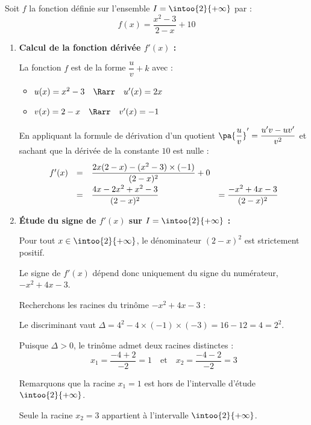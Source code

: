 \begin{ex}
	Soit $f$ la fonction définie sur l'ensemble $I = \intoo{2}{+\infty}$ par :
	\[
		f(x) = \frac{x^2 - 3}{2 - x} + 10
	\]

	\begin{enumerate}
		\item \textbf{Calcul de la fonction dérivée $f'(x)$ :}

		      La fonction $f$ est de la forme $\dfrac{u}{v} + k$ avec :
		      \begin{itemize}
			      \item $u(x) = x^2 - 3 \quad\Rarr\quad u'(x) = 2x$
			      \item $v(x) = 2 - x \quad\Rarr\quad v'(x) = -1$
		      \end{itemize}

		      En appliquant la formule de dérivation d'un quotient $\pa{\dfrac{u}{v}}' = \dfrac{u'v - uv'}{v^2}$ et sachant que la dérivée de la constante $10$ est nulle :
		      \[
			      \def\arraystretch{2}
			      \begin{array}{rcll}
				      f'(x) & = & \dfrac{2x(2 - x) - (x^2 - 3) \times (-1)}{(2 - x)^2} + 0 &                                    \\
				            & = & \dfrac{4x - 2x^2 + x^2 - 3}{(2 - x)^2}                   & = \dfrac{-x^2 + 4x - 3}{(2 - x)^2}
			      \end{array}
		      \]

		\item \textbf{Étude du signe de $f'(x)$ sur $I = \intoo{2}{+\infty}$ :}

		      Pour tout $x \in \intoo{2}{+\infty}$, le dénominateur $(2 - x)^2$ est strictement positif.

		      Le signe de $f'(x)$ dépend donc uniquement du signe du numérateur, $-x^2 + 4x - 3$.

		      Recherchons les racines du trinôme $-x^2 + 4x - 3$ :

		      Le discriminant vaut $\Delta = 4^2 - 4 \times (-1) \times (-3) = 16 - 12 = 4 = 2^2$.

		      Puisque $\Delta > 0$, le trinôme admet deux racines distinctes :
		      \[
			      x_1 = \frac{-4 + 2}{-2} = 1 \quad\text{et}\quad x_2 = \frac{-4 - 2}{-2} = 3
		      \]

		      Remarquons que la racine $x_1 = 1$ est hors de l'intervalle d'étude $\intoo{2}{+\infty}$.

		      Seule la racine $x_2 = 3$ appartient à l'intervalle $\intoo{2}{+\infty}$.


\end{enumerate}
\end{ex}

